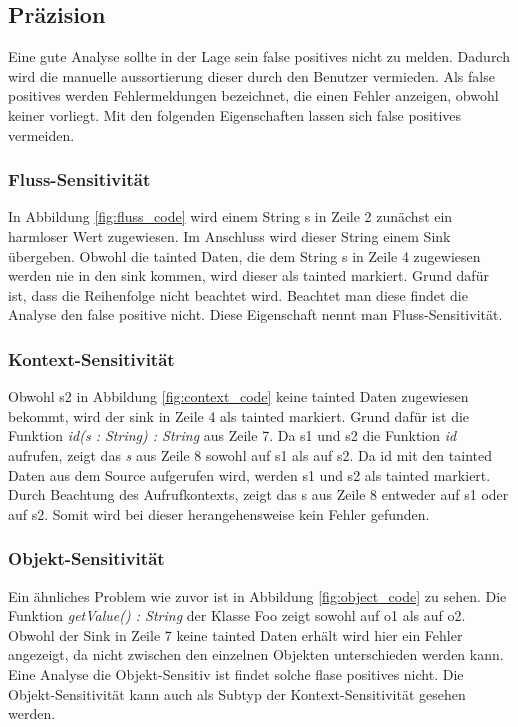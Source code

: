\documentclass[runningheads]{llncs}
\begin{document}
\subsection{Präzision}
Eine gute Analyse sollte in der Lage sein false positives nicht zu melden. Dadurch wird die manuelle aussortierung dieser durch den Benutzer vermieden. Als false positives werden Fehlermeldungen bezeichnet, die einen Fehler anzeigen, obwohl keiner vorliegt. Mit den folgenden Eigenschaften lassen sich false positives vermeiden.
\subsubsection{Fluss-Sensitivität}
In Abbildung \ref{fig:fluss_code} wird einem String s in Zeile 2 zunächst ein harmloser Wert zugewiesen. Im Anschluss wird dieser String einem Sink übergeben. Obwohl die tainted Daten, die dem String s in Zeile 4 zugewiesen werden nie in den sink kommen, wird dieser als tainted markiert. Grund dafür ist, dass die Reihenfolge nicht beachtet wird. Beachtet man diese findet die Analyse den false positive nicht. Diese Eigenschaft nennt man Fluss-Sensitivität.



\subsubsection{Kontext-Sensitivität}
Obwohl s2 in Abbildung \ref{fig:context_code} keine tainted Daten zugewiesen bekommt, wird der sink in Zeile 4 als tainted markiert. Grund dafür ist die Funktion \emph{id(s : String) : String} aus Zeile 7. Da s1 und s2 die Funktion \emph{id} aufrufen, zeigt das \emph{s} aus Zeile 8 sowohl auf s1 als auf s2. Da id mit den tainted Daten aus dem Source aufgerufen wird, werden s1 und s2 als tainted markiert. Durch Beachtung des Aufrufkontexts, zeigt das s aus Zeile 8 entweder auf s1 oder auf s2. Somit wird bei dieser herangehensweise kein Fehler gefunden.


\subsubsection{Objekt-Sensitivität}
Ein ähnliches Problem wie zuvor ist in Abbildung \ref{fig:object_code} zu sehen. Die Funktion \emph{getValue() : String} der Klasse Foo zeigt sowohl auf o1 als auf o2. Obwohl der Sink in Zeile 7 keine tainted Daten erhält wird hier ein Fehler angezeigt, da nicht zwischen den einzelnen Objekten unterschieden werden kann. Eine Analyse die Objekt-Sensitiv ist findet solche flase positives nicht. Die Objekt-Sensitivität kann auch als Subtyp der Kontext-Sensitivität gesehen werden.
\end{document}
